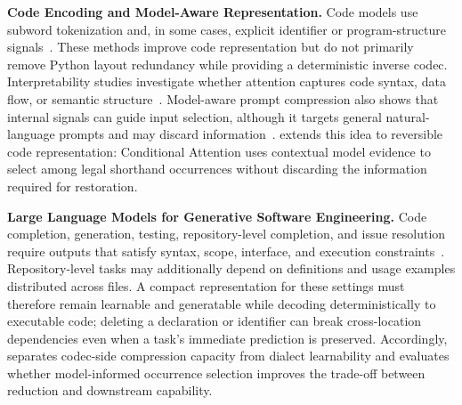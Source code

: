\textbf{Code Encoding and Model-Aware Representation.} Code models use subword tokenization and, in some cases, explicit identifier or program-structure signals~\cite{sennrich2016,karampatsis2020,wang2021,feng2020,guo2021,guo2022}. These methods improve code representation but do not primarily remove Python layout redundancy while providing a deterministic inverse codec. Interpretability studies investigate whether attention captures code syntax, data flow, or semantic structure~\cite{chen2022cat,wan2022,karmakar2021,bui2019,ma2022}. Model-aware prompt compression also shows that internal signals can guide input selection, although it targets general natural-language prompts and may discard information~\cite{llmlingua2023}. \tool extends this idea to reversible code representation: Conditional Attention uses contextual model evidence to select among legal shorthand occurrences without discarding the information required for restoration.

\textbf{Large Language Models for Generative Software Engineering.} Code completion, generation, testing, repository-level completion, and issue resolution require outputs that satisfy syntax, scope, interface, and execution constraints~\cite{raychev2014,chen2021codex,lemieux2023codamosa,liu2023repobench,jimenez2024swebench}. Repository-level tasks may additionally depend on definitions and usage examples distributed across files. A compact representation for these settings must therefore remain learnable and generatable while decoding deterministically to executable code; deleting a declaration or identifier can break cross-location dependencies even when a task's immediate prediction is preserved. Accordingly, \tool separates codec-side compression capacity from dialect learnability and evaluates whether model-informed occurrence selection improves the trade-off between reduction and downstream capability.
